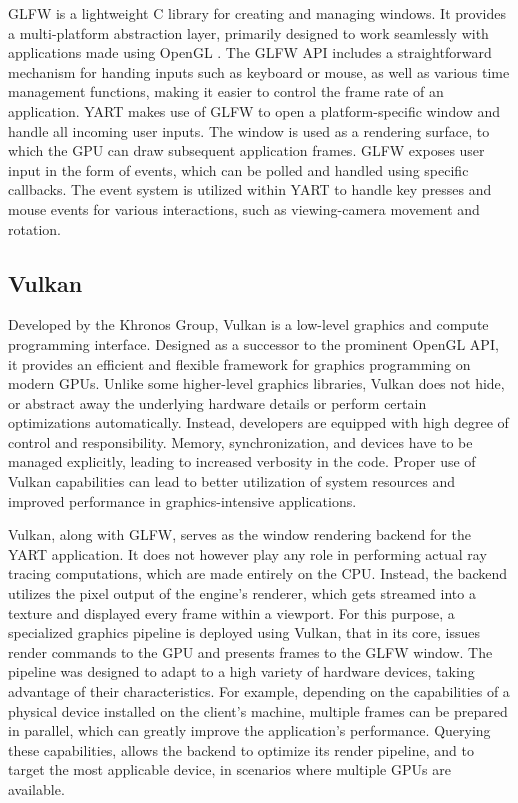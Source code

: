 GLFW \supercite{GLFW} is a lightweight C library for creating and managing windows.
It provides a multi-platform abstraction layer, primarily designed to work seamlessly with applications made using OpenGL \supercite{Neider1993}.
The GLFW API includes a straightforward mechanism for handing inputs such as keyboard or mouse, as well as various time management functions, making it easier to control the frame rate of an application.
YART makes use of GLFW to open a platform-specific window and handle all incoming user inputs. 
The window is used as a rendering surface, to which the GPU can draw subsequent application frames. 
GLFW exposes user input in the form of events, which can be polled and handled using specific callbacks. 
The event system is utilized within YART to handle key presses and mouse events for various interactions, such as viewing-camera movement and rotation.

\subsection{Vulkan}

Developed by the Khronos Group, Vulkan \supercite{Sellers2016} is a low-level graphics and compute programming interface.
Designed as a successor to the prominent OpenGL API, it provides an efficient and flexible framework for graphics programming on modern GPUs.
Unlike some higher-level graphics libraries, Vulkan does not hide, or abstract away the underlying hardware details or perform certain optimizations automatically. 
Instead, developers are equipped with high degree of control and responsibility.
Memory, synchronization, and devices have to be managed explicitly, leading to increased verbosity in the code.
Proper use of Vulkan capabilities can lead to better utilization of system resources and improved performance in graphics-intensive applications.

Vulkan, along with GLFW, serves as the window rendering backend for the YART application.
It does not however play any role in performing actual ray tracing computations, which are made entirely on the CPU. 
Instead, the backend utilizes the pixel output of the engine's renderer, which gets streamed into a texture and displayed every frame within a viewport.
For this purpose, a specialized graphics pipeline is deployed using Vulkan, that in its core, issues render commands to the GPU and presents frames to the GLFW window. The pipeline was designed to adapt to a high variety of hardware devices, taking advantage of their characteristics.
For example, depending on the capabilities of a physical device installed on the client's machine, multiple frames can be prepared in parallel, which can greatly improve the application's performance.
Querying these capabilities, allows the backend to optimize its render pipeline, and to target the most applicable device, in scenarios where multiple GPUs are available.

